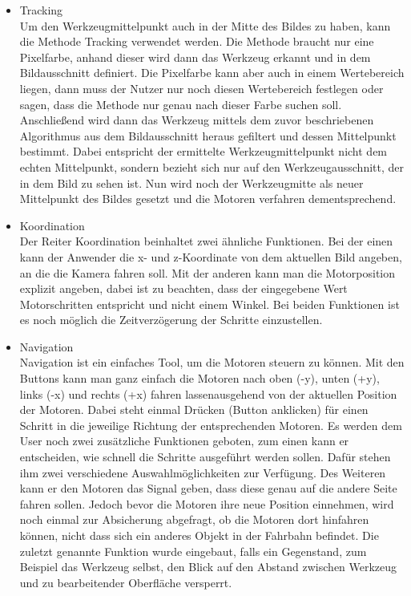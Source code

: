 \documentclass[12pt,a4paper,bibliography=totocnumbered,listof=totocnumbered]{scrartcl}
\begin{document}
\begin{itemize}
\begin{itemize}
\item Tracking\\
Um den Werkzeugmittelpunkt auch in der Mitte des Bildes zu haben, kann die Methode Tracking verwendet werden. Die Methode braucht nur eine Pixelfarbe, anhand dieser wird dann das Werkzeug erkannt und in dem Bildausschnitt definiert. Die Pixelfarbe kann aber auch in einem Wertebereich liegen, dann muss der Nutzer nur noch diesen Wertebereich festlegen oder sagen, dass die Methode nur genau nach dieser Farbe suchen soll. Anschließend wird dann das Werkzeug mittels dem zuvor beschriebenen Algorithmus aus dem Bildausschnitt heraus gefiltert und dessen Mittelpunkt bestimmt. Dabei entspricht der ermittelte Werkzeugmittelpunkt nicht dem echten Mittelpunkt, sondern bezieht sich nur auf den Werkzeugausschnitt, der in dem Bild zu sehen ist.  Nun  wird noch der Werkzeugmitte als neuer Mittelpunkt des Bildes gesetzt und die Motoren verfahren dementsprechend.
\item Koordination\\
Der Reiter Koordination beinhaltet zwei ähnliche Funktionen. Bei der einen kann der Anwender die x- und z-Koordinate von dem aktuellen Bild angeben, an die die Kamera fahren soll. Mit der anderen kann man die Motorposition explizit angeben, dabei ist zu beachten, dass der eingegebene Wert Motorschritten entspricht und nicht einem Winkel.
Bei beiden Funktionen ist es noch möglich die Zeitverzögerung der Schritte einzustellen.
\item Navigation\\
Navigation ist ein einfaches Tool, um die Motoren steuern zu können. Mit den Buttons kann man ganz einfach die Motoren nach oben (-y), unten (+y),  links (-x) und rechts (+x) fahren lassenausgehend von der aktuellen Position der Motoren. Dabei steht einmal Drücken (Button anklicken) für einen Schritt in die jeweilige Richtung der entsprechenden Motoren.
Es werden dem User noch zwei zusätzliche Funktionen geboten, zum einen kann er entscheiden, wie schnell die Schritte ausgeführt werden sollen. Dafür stehen ihm zwei verschiedene Auswahlmöglichkeiten zur Verfügung. Des Weiteren kann er den Motoren das Signal geben, dass diese genau auf die andere Seite fahren sollen. Jedoch bevor die Motoren ihre neue Position einnehmen, wird noch einmal zur Absicherung abgefragt, ob die Motoren dort hinfahren können, nicht dass sich ein anderes Objekt in der Fahrbahn befindet. Die zuletzt genannte Funktion wurde eingebaut, falls ein Gegenstand, zum Beispiel das Werkzeug selbst, den Blick auf den Abstand zwischen Werkzeug und zu bearbeitender Oberfläche versperrt.

\end{itemize}
\end{itemize}
\end{document}
